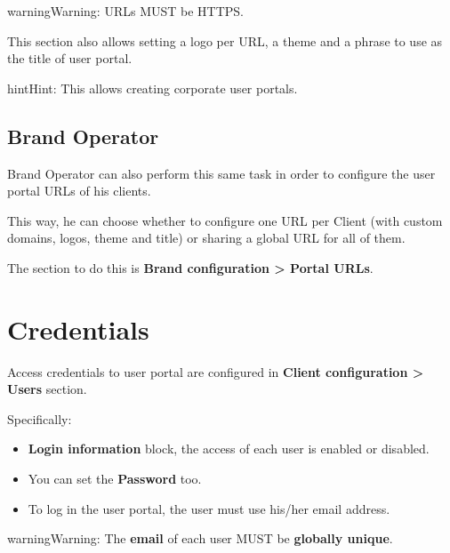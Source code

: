 \documentclass[letterpaper,10pt,english]{sphinxmanual}
\begin{document}
\begin{notice}{warning}{Warning:}
URLs MUST be HTTPS.
\end{notice}

This section also allows setting a logo per URL, a theme and a phrase to use as
the title of user portal.

\begin{notice}{hint}{Hint:}
This allows creating corporate user portals.
\end{notice}


\subsection{Brand Operator}
\label{user_portal/urls:brand-operator}
Brand Operator can also perform this same task in order to configure the user
portal URLs of his clients.

This way, he can choose whether to configure one URL per Client (with custom
domains, logos, theme and title) or sharing a global URL for all of them.

The section to do this is \textbf{Brand configuration \textgreater{} Portal URLs}.


\section{Credentials}
\label{user_portal/credentials:credentials}\label{user_portal/credentials::doc}
Access credentials to user portal are configured in \textbf{Client configuration \textgreater{}
Users} section.

Specifically:
\begin{itemize}
\item {} 
\textbf{Login information} block, the access of each user is enabled or disabled.

\item {} 
You can set the \textbf{Password} too.

\item {} 
To log in the user portal, the user must use his/her email address.

\end{itemize}

\begin{notice}{warning}{Warning:}
The \textbf{email} of each user MUST be \textbf{globally unique}.
\end{notice}
\end{document}
